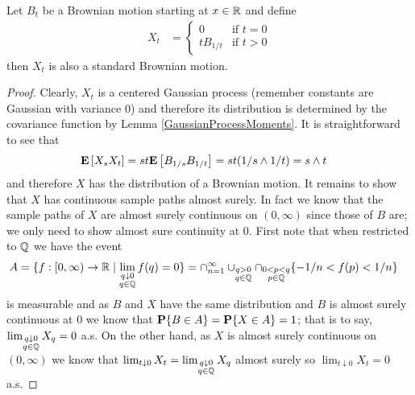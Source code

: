 \begin{lem}Let $B_t$ be a Brownian
  motion starting at $x \in \mathbb{R}$ and define 
\begin{align*}
X_t &= \begin{cases}
0 & \text{if $t=0$} \\
t B_{1/t} & \text{if $t > 0$}
\end{cases}
\end{align*}
then $X_t$ is also a standard Brownian motion.
\end{lem}
\begin{proof}
Clearly, $X_t$ is a centered Gaussian process (remember constants are
Gaussian with variance $0$) and
therefore its distribution is determined by the covariance function
 by Lemma \ref{GaussianProcessMoments}.  It is straightforward to see
 that 
\begin{align*}
\textbf{E}\left[X_s X_t\right] &= st \textbf{E}\left[B_{1/s} B_{1/t}\right] = st
 (1/s \wedge 1/t) = s \wedge t
\end{align*}
and therefore $X$ has the distribution of a Brownian motion.  It
remains to show that $X$ has continuous sample paths almost surely.  In fact we know
that the sample paths of $X$ are almost surely continuous on $(0,\infty)$ since
those of $B$ are; we only need to show almost sure continuity at $0$.  First note
that when restricted to $\mathbb{Q}$ we have the event 
\begin{align*}
A &= \lbrace f :[0, \infty) \to \mathbb{R} \mid \lim_{\substack{q \downarrow 0 \\
    q \in \mathbb{Q}}} f(q) = 0 \rbrace 
= \cap_{n=1}^\infty \cup_{\substack{q > 0\\q \in \mathbb{Q}}}
\cap_{\substack{0 < p < q \\ p \in \mathbb{Q}}} \lbrace -1/n < f(p) <
1/n \rbrace 
\end{align*}
is measurable and as $B$ and $X$ have the same distribution and $B$ is almost surely
continuous at $0$ we know that $\textbf{P}\{B \in A\} = \textbf{P}\{
  X \in A\} = 1$; that is to say, $\lim_{\substack{q \downarrow 0 \\ q
    \in \mathbb{Q}}} X_q = 0$ a.s.  On the other hand, as $X$ is
almost surely continuous on $(0, \infty)$ we know that $\lim_{t
  \downarrow 0} X_t = \lim_{\substack{q \downarrow 0 \\ q
    \in \mathbb{Q}}} X_q$ almost surely so $\lim_{t \downarrow 0} X_t
= 0$ a.s. 
\end{proof}

